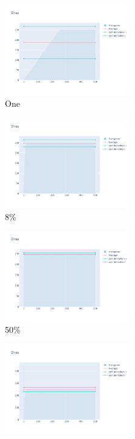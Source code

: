 \documentclass[12pt, fleqn]{report}                             %
\theoremstyle{break}                                            %
\begin{document}
      \begin{figure}[ht!]
        \centering
        \begin{subfigure}[b]{0.4\linewidth}
          \includegraphics[width=0.6\textwidth]{Images/50/dia-a.png}
          \caption{One}
        \end{subfigure}
        \begin{subfigure}[b]{0.4\linewidth}
          \includegraphics[width=0.6\textwidth]{Images/50/dia-b.png}
          \caption{8\%}
        \end{subfigure}
        \begin{subfigure}[b]{0.4\linewidth}
          \includegraphics[width=0.6\textwidth]{Images/50/dia-c.png}
          \caption{50\%}
        \end{subfigure}
        \begin{subfigure}[b]{0.4\linewidth}
          \includegraphics[width=0.6\textwidth]{Images/50/dia-d.png}

\end{subfigure}
\end{figure}
\end{document}
